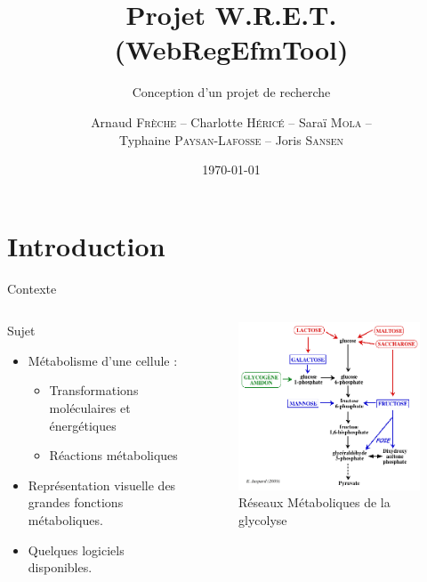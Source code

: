 \documentclass{beamer}
\title{\textcolor{bleu2}{\textbf{Projet W.R.E.T. (WebRegEfmTool)}}}
\subtitle{\textcolor{bleu1}{Conception d'un projet de recherche}}
\author[]{Arnaud \textsc{Frèche} -- Charlotte \textsc{Héricé} -- Saraï \textsc{Mola} -- \\ Typhaine \textsc{Paysan-Lafosse} -- Joris \textsc{Sansen}}
\institute{Master 2 BioInformatique}
\date{\today}
\begin{document}
\frame{\titlepage}
\frame{\tableofcontents}


\section*{Introduction}

\begin{frame}{\textcolor{bleu2}{\hspace{1cm}Contexte}}
	\begin{columns}
		\begin{column}{7cm}
			\begin{block}{\hspace{0.4cm}Sujet}
				\begin{itemize}
					\item Métabolisme d'une cellule : 
					\begin{itemize}
						\item Transformations moléculaires et énergétiques
						\item Réactions métaboliques
					\end{itemize}
					\item Représentation visuelle des grandes fonctions métaboliques.\\
					\item Quelques logiciels disponibles.
				\end{itemize}
			\end{block}
		\end{column}	
		\begin{column}{3.5cm}
			\begin{figure}
				\includegraphics[scale=0.25]{../Images/pyruvate.png}
				\caption{Réseaux Métaboliques de la glycolyse}
			\end{figure}
		\end{column}
	\end{columns}
\end{frame}
\end{document}
